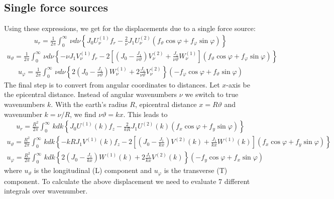 \documentclass[12pt,a4paper]{article}
\begin{document}
\subsection{Single force sources}
Using these expressions, we get for the displacements due to a single force source:
\begin{align}
u_r = \frac{1}{2\pi}\int_0^\infty\,\nu d\nu \left\{J_0 U_\nu^{(1)}f_r-\frac{2}{\nu}J_1 U_\nu^{(2)}(f_\vartheta\cos\varphi+f_\varphi\sin\varphi)\right\} \nonumber
\end{align}
\begin{align}
u_\vartheta = \frac{1}{2\pi}\int_0^\infty\,\nu d\nu \left\{-\nu J_1 V_\nu^{(1)}f_r -2\left[\left(J_0-\frac{J_1}{\nu\vartheta}\right) V_\nu^{(2)}+\frac{J_1}{\nu\vartheta}W_\nu^{(1)}\right] \left(f_{\vartheta}\cos\varphi+f_{\varphi}\sin\varphi\right)\right\}  \nonumber
\end{align}
\begin{align}
u_\varphi = \frac{1}{2\pi}\int_0^\infty\,\nu d\nu \left\{2\left(J_0-\frac{J_1}{\nu\vartheta}\right)W_\nu^{(1)}+2\frac{J_1}{\nu\vartheta}V_\nu^{(2)}\right\}(-f_\varphi\cos\varphi+f_\vartheta\sin\varphi) \nonumber
\end{align}
The final step is to convert from angular coordinates to distances. Let $x$-axis be the epicentral distance. Instead of angular wavenumbers $\nu$ we switch to true wavenumbers $k$. With the earth's radius $R$, epicentral distance $x=R\vartheta$ and wavenumber $k=\nu/R$, we find $\nu\vartheta=kx$. This leads to 
\begin{align}
u_r = \frac{R^2}{2\pi}\int_0^\infty\,k dk \left\{J_0 U^{(1)}(k)f_z-\frac{2}{kR}J_1 U^{(2)}(k)(f_x\cos\varphi+f_y\sin\varphi)\right\} \nonumber
\end{align}
\begin{align}
u_\vartheta = \frac{R^2}{2\pi}\int_0^\infty\,k dk \left\{-kR J_1 V^{(1)}(k)f_z -2\left[\left(J_0-\frac{J_1}{kx}\right) V^{(2)}(k)+\frac{J_1}{kx}W^{(1)}(k)\right] \left(f_x\cos\varphi+f_y\sin\varphi\right)\right\} \nonumber
\end{align}
\begin{align}
u_\varphi = \frac{R^2}{2\pi}\int_0^\infty\,k dk \left\{2\left(J_0-\frac{J_1}{kx}\right)W^{(1)}(k)+2\frac{J_1}{kx}V^{(2)}(k)\right\}(-f_y\cos\varphi+f_x\sin\varphi) \nonumber
\end{align}
where $u_\vartheta$ is the longitudinal (L) component and $u_\varphi$ is the transverse (T) component.
To calculate the above displacement we need to evaluate 7 different integrals over wavenumber.
\end{document}
